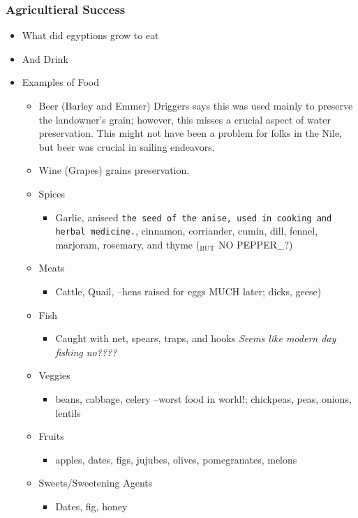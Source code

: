 \documentclass[11pt]{article}
\begin{document}
\subsubsection{Agricultieral Success}
\label{sec-4-5-3}
\begin{itemize}
\item What did egyptions grow to eat
\item And Drink

\item Examples of Food
\begin{itemize}
\item Beer (Barley and Emmer) Driggers says this was used mainly to preserve the landowner's grain; however, this misses a crucial aspect of water preservation. 
This might not have been a problem for folks in the Nile, but beer was crucial in sailing endeavors.
\item Wine (Grapes) grains preservation.
\item Spices 
\begin{itemize}
\item Garlic, aniseed \texttt{the seed of the anise, used in cooking and herbal medicine.}, cinnamon, corriander, cumin, dill, fennel, marjoram, rosemary, and thyme ($_{\text{BUT}}$ NO PEPPER\_?)
\end{itemize}
\item Meats
\begin{itemize}
\item Cattle, Quail, --hens raised for eggs MUCH later; dicks, geese)
\end{itemize}
\item Fish
\begin{itemize}
\item Caught with net, spears, traps, and hooks \emph{Seems like modern day fishing no????}
\end{itemize}
\item Veggies
\begin{itemize}
\item beans, cabbage, celery --worst food in world!; chickpeas, peas, onions, lentils
\end{itemize}
\item Fruits
\begin{itemize}
\item apples, dates, figs, jujubes, olives, pomegranates, melons
\end{itemize}
\item Sweets/Sweetening Agents
\begin{itemize}
\item Dates, fig, honey
\end{itemize}
\end{itemize}
\end{itemize}
\end{document}
